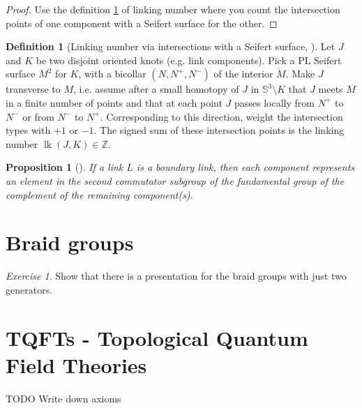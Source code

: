\documentclass[nobib]{tufte-book} %
\newtheorem{proposition}{Proposition}
\theoremstyle{definition}
\newtheorem{definition}{Definition}
\theoremstyle{remark}
\newtheorem{exercise}{Exercise}
\DeclareMathOperator{\lk}{lk}
\newcommand{\sphere}[1]{\mathbb{S}^{#1}}
\newcommand{\Z}{\mathbb{Z}}
\begin{document}
\begin{proof}
	Use the definition \ref{def:linking_numbers_via_intersections_with_Seifert_surface} 
	of linking number where you count
	the intersection points of one component with a Seifert surface for the
	other.
\end{proof}

\begin{definition}[{Linking number via intersections with a Seifert surface,
	\citep[5.D.(2)]{rolfsen2003knots}}]
	\label{def:linking_numbers_via_intersections_with_Seifert_surface}
	Let $J$ and $K$ be two disjoint oriented knots (e.g. link components).
	Pick a PL Seifert surface $M^{2}$ for $K$, with
	a bicollar $(N, N^{+}, N^{-})$ of the interior $\mathring{M}$.
	Make $J$ transverse to $M$, i.e. assume after a small
	homotopy of $J$ in $\sphere{3} \setminus K$ that
	$J$ meets $M$ in a finite number of points
	and that at each point $J$ passes locally
	from $N^{+}$ to $N^{-}$ or from $N^{-}$ to $N^{+}$.
	Corresponding to this direction, weight the intersection types
	with $+1$ or $-1$.
	The signed sum of these intersection points is the linking
	number $\lk(J, K) \in \Z$.
\end{definition}

\begin{proposition}[{\citep[5.E.8]{rolfsen2003knots}}]
	If a link $L$ is a boundary link, then each component
	represents an element
	in the second commutator subgroup
	of the fundamental group of the complement
	of the remaining component(s).
\end{proposition}

\section{Braid groups}

\begin{exercise}
	Show that there is a presentation for the braid groups
	with just two generators.
\end{exercise}

\section{TQFTs - Topological Quantum Field Theories}

TODO Write down axioms
\end{document}
